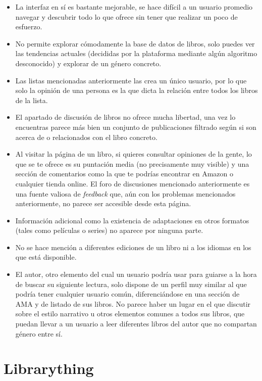 \begin{itemize}
    \item La interfaz en sí es bastante mejorable, se hace difícil a un usuario promedio navegar y descubrir todo lo que ofrece sin tener que realizar un poco de esfuerzo.
    \item No permite explorar cómodamente la base de datos de libros, solo puedes ver las tendencias actuales (decididas por la plataforma mediante algún algoritmo desconocido) y explorar de un género concreto.
    \item Las listas mencionadas anteriormente las crea un único usuario, por lo que solo la opinión de una persona es la que dicta la relación entre todos los libros de la lista.
    \item El apartado de discusión de libros no ofrece mucha libertad, una vez lo encuentras parece más bien un conjunto de publicaciones filtrado según si son acerca de o relacionados con el libro concreto.
    \item Al visitar la página de un libro, si quieres consultar opiniones de la gente, lo que se te ofrece es su puntación media (no precisamente muy visible) y una sección de comentarios como la que te podrías encontrar en Amazon o cualquier tienda online. El foro de discusiones mencionado anteriormente es una fuente valiosa de \textit{feedback} que, aún con los problemas mencionados anteriormente, no parece ser accesible desde esta página.
    \item Información adicional como la existencia de adaptaciones en otros formatos (tales como películas o series) no aparece por ninguna parte.
    \item No se hace mención a diferentes ediciones de un libro ni a los idiomas en los que está disponible.
    \item El autor, otro elemento del cual un usuario podría usar para guiarse a la hora de buscar su siguiente lectura, solo dispone de un perfil muy similar al que podría tener cualquier usuario común, diferenciándose en una sección de AMA y de listado de sus libros. No parece haber un lugar en el que discutir sobre el estilo narrativo u otros elementos comunes a todos sus libros, que puedan llevar a un usuario a leer diferentes libros del autor que no compartan género entre sí.
\end{itemize}

\section{Librarything}

